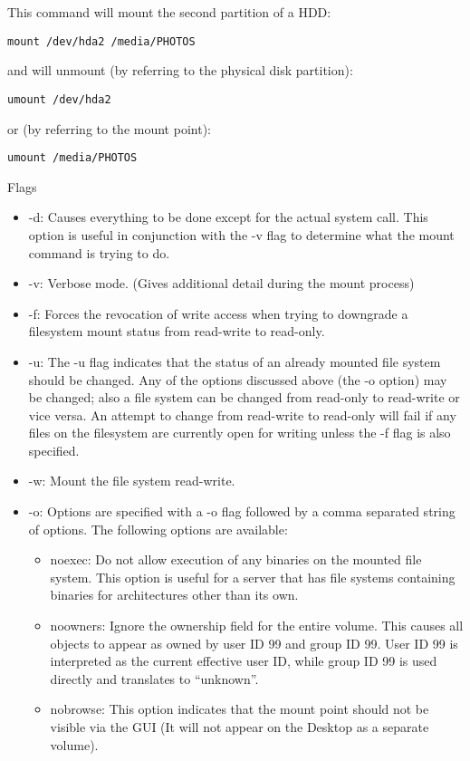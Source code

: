 \documentclass[hidelinks,12pt,a4paper,numbers=enddot]{scrartcl}
\begin{document}
This command will mount the second partition of a HDD:\\
\begin{verbatim}
mount /dev/hda2 /media/PHOTOS
\end{verbatim}

and will unmount (by referring to the physical disk partition):\\
\begin{verbatim}
umount /dev/hda2
\end{verbatim}

or (by referring to the mount point):\\
\begin{verbatim}
umount /media/PHOTOS
\end{verbatim}

Flags
\begin{itemize}
    \item -d: Causes everything to be done except for the actual system call.
        This option is useful in conjunction with the -v flag to determine
        what the mount command is trying to do.
    \item -v: Verbose mode. (Gives additional detail during the mount process)
    \item -f: Forces the revocation of write access when trying to downgrade a
        filesystem mount status from read-write to read-only.
    \item -u: The -u flag indicates that the status of an already mounted file
        system should be changed.  Any of the options discussed above
        (the -o option) may be changed; also a file system can be changed
        from read-only to read-write or vice versa.  An attempt to change
        from read-write to read-only will fail if any files on the
        filesystem are currently open for writing unless the -f flag is
        also specified.
      \item -w: Mount the file system read-write.
      \item -o: Options are specified with a -o flag followed by a comma separated
        string of options.  The following options are available:
        \begin{itemize}
            \item noexec: Do not allow execution of any binaries on the mounted file system.
                This option is useful for a server that has file systems containing
                binaries for architectures other than its own.
            \item noowners: Ignore the ownership field for the entire volume. This causes all
                objects to appear as owned by user ID 99 and group ID 99. User ID 99
                is interpreted as the current effective user ID, while group ID 99 is
                used directly and translates to ``unknown''.
            \item nobrowse: This option indicates that the mount point should not be visible via
                the GUI (It will not appear on the Desktop as a separate volume).
        \end{itemize}
    
\end{itemize}
\end{document}
